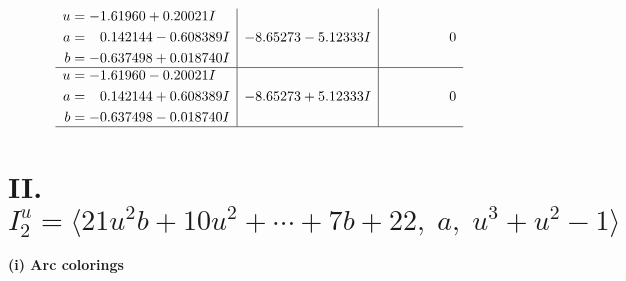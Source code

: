 \documentclass[1p]{elsarticle_modified}
\theoremstyle{definition}
\begin{document}
$$\begin{array}{c|c|c}
\begin{aligned}
u &= -1.61960 + 0.20021 I \\
a &= \phantom{-}0.142144 - 0.608389 I \\
b &= -0.637498 + 0.018740 I\end{aligned}
 & -8.65273 - 5.12333 I & \phantom{-0.000000 } 0 \\ \hline\begin{aligned}
u &= -1.61960 - 0.20021 I \\
a &= \phantom{-}0.142144 + 0.608389 I \\
b &= -0.637498 - 0.018740 I\end{aligned}
 & -8.65273 + 5.12333 I & \phantom{-0.000000 } 0\\
 \hline 
 \end{array}$$\newpage\newpage\renewcommand{\arraystretch}{1}
\centering \section*{II. $I^u_{2}= \langle 21 u^2 b+10 u^2+\cdots+7 b+22,\;a,\;u^3+u^2-1 \rangle$}
\flushleft \textbf{(i) Arc colorings}\\
\end{document}
